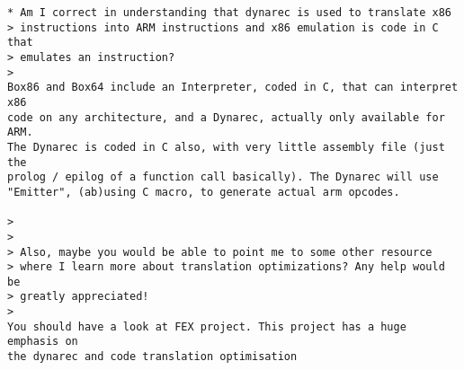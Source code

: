 \begin{Verbatim}[fontsize=\footnotesize]
* Am I correct in understanding that dynarec is used to translate x86
> instructions into ARM instructions and x86 emulation is code in C that
> emulates an instruction?
>
Box86 and Box64 include an Interpreter, coded in C, that can interpret x86
code on any architecture, and a Dynarec, actually only available for ARM.
The Dynarec is coded in C also, with very little assembly file (just the
prolog / epilog of a function call basically). The Dynarec will use
"Emitter", (ab)using C macro, to generate actual arm opcodes.

>
>
> Also, maybe you would be able to point me to some other resource
> where I learn more about translation optimizations? Any help would be
> greatly appreciated!
>
You should have a look at FEX project. This project has a huge emphasis on
the dynarec and code translation optimisation
\end{Verbatim}

\pagebreak
